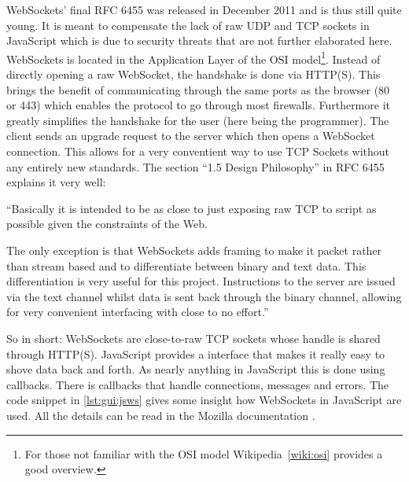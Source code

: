 WebSockets' final RFC 6455\cite{rfc:6455} was released in December 2011 and is thus still quite young. It is meant to compensate the lack of raw UDP and TCP sockets in JavaScript which is due to security threats that are not further elaborated here.
WebSockets is located in the Application Layer of the OSI model\footnote{For those not familiar with the OSI model Wikipedia~\ref{wiki:osi} provides a good overview.}.
Instead of directly opening a raw WebSocket, the handshake is done via HTTP(S). This brings the benefit of communicating through the same ports as the browser (80 or 443) which enables the protocol to go through most firewalls. Furthermore it greatly simplifies the handshake for the user (here being the programmer).
The client sends an upgrade request to the server which then opens a WebSocket connection.
This allows for a very conventient way to use TCP Sockets without any entirely new standards.
The section ``1.5 Design Philosophy'' in RFC 6455\cite{rfc:6455} explains it very well:

``Basically it is intended to be as close to just exposing raw TCP to script as possible given the constraints of the Web.

The only exception is that WebSockets adds framing to make it packet rather than stream based and to differentiate between binary and text data.
This differentiation is very useful for this project. Instructions to the server are issued via the text channel whilst data is sent back through the binary channel, allowing for very convenient interfacing with close to no effort.''

So in short: WebSockets are close-to-raw TCP sockets whose handle is shared through HTTP(S).
JavaScript provides a interface that makes it really easy to shove data back and forth.
As nearly anything in JavaScript this is done using callbacks. There is callbacks that handle connections, messages and errors. The code snippet in \ref{lst:gui:jsws} gives some insight how WebSockets in JavaScript are used. All the details can be read in the Mozilla documentation \cite{moz:ws}.


